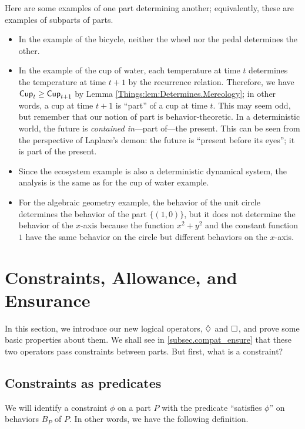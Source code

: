 \begin{ex}
Here are some examples of one part determining another; equivalently, these are examples of subparts of parts.
\begin{itemize}
    \item In the example of the bicycle, neither the wheel nor the pedal determines the other.
    \item In the example of the cup of water, each temperature at time $t$ determines the temperature at time $t + 1$ by the recurrence relation. Therefore, we have $\mathsf{{Cup}}_t \geq \mathsf{{Cup}}_{t + 1}$ by Lemma \ref{Things:lem:Determines.Mereology}; in other words, a cup at time $t + 1$ is ``part'' of a cup at time $t$. This may seem odd, but remember that our notion of part is behavior-theoretic. In a deterministic world, the future is \emph{contained in}---part of---the present. This can be seen from the perspective of Laplace's demon: the future is ``present before its eyes''; it is part of the present.
    \item Since the ecosystem example is also a deterministic dynamical system, the analysis is the same as for the cup of water example.
    \item For the algebraic geometry example, the behavior of the unit circle determines the behavior of the part $\{(1,0)\}$, but it does not determine the behavior of the $x$-axis because the function $x^2+y^2$ and the constant function $1$ have the same behavior on the circle but different behaviors on the $x$-axis.
\end{itemize}
\end{ex}


\section{Constraints, Allowance, and Ensurance}

In this section, we introduce our new logical operators, $\Diamond_{}^{}$ and $\Box_{}^{}$, and prove some basic properties about them. We shall see in \cref{subsec.compat_ensure} that these two operators pass constraints between parts. But first, what is a constraint?

\subsection{Constraints as predicates}
We will identify a constraint $\phi$ on a part $P$ with the predicate ``satisfies $\phi$'' on behaviors $B_P$ of $P$. In other words, we have the following definition.

